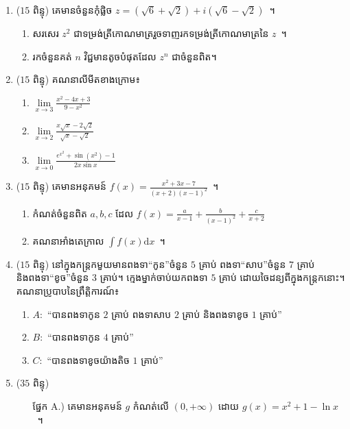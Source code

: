\documentclass[11pt,a4paper]{article}
\def\hhard{\leavevmode\makebox[0pt][r]{\large\ensuremath{\star\star}\hspace{2em}}}
\begin{document}
\begin{enumerate}[I]
\item ($ 15 $ ពិន្ទុ) គេមានចំនួនកុំផ្លិច $ z=(\sqrt{6}+\sqrt{2})+i(\sqrt{6}-\sqrt{2}) $~។
\begin{enumerate}[1]
\item សរសេរ $ z^2 $ ជាទម្រង់ត្រីកោណមាត្ររួចទាញរកទម្រង់ត្រីកោណមាត្រនៃ $ z $~។
\item រកចំនួនគត់ $ n $ វិជ្ជមានតូចបំផុតដែល $ z^n $ ជាចំនួនពិត។
\end{enumerate}
\item ($ 15 $ ពិន្ទុ) គណនាលីមីតខាងក្រោម៖
\begin{multicols}{3}
\begin{enumerate}[a]
\item $ \lim\limits_{x\to 3}\frac{x^2-4x+3}{9-x^2} $
\item $ \lim\limits_{x\to 2}\frac{x\sqrt{x}-2\sqrt{2}}{\sqrt{x}-\sqrt{2}} $
\item $ \lim\limits_{x\to 0}\frac{e^{x^2}+\sin (x^2)-1}{2x\sin x} $
\end{enumerate}
\end{multicols}
\item ($ 15 $ ពិន្ទុ) គេមានអនុគមន៍ $ f(x)=\frac{x^2+3x-7}{(x+2)(x-1)^2} $~។
\begin{enumerate}[1]
\item កំណត់ចំនួនពិត $ a,b,c $ ដែល $ f(x)=\frac{a}{x-1}+\frac{b}{(x-1)^2}+\frac{c}{x+2} $
\item គណនាអាំងតេក្រាល $ \int f(x)\mathrm{d}x $~។
\end{enumerate}
\item ($ 15 $ ពិន្ទុ) នៅក្នុងកន្ត្រកមួយមានពងទា``កូន''ចំនួន $ 5 $ គ្រាប់ ពងទា``សាប''ចំនួន $ 7 $ គ្រាប់ និងពងទា``ខូច''ចំនួន $ 3 $ គ្រាប់។ ក្មេងម្នាក់ចាប់យកពងទា $ 5 $ គ្រាប់ ដោយចៃដន្យពីក្នុងកន្ត្រកនោះ។\\
គណនាប្រូបាបនៃព្រឹត្តិការណ៍៖
\begin{enumerate}[a]
\item $ A: $ ``បានពងទាកូន $ 2 $ គ្រាប់ ពងទាសាប $ 2 $ គ្រាប់ និងពងទាខូច $ 1 $ គ្រាប់''
\item $ B: $ ``បានពងទាកូន $ 4 $ គ្រាប់''
\item $ C: $ ``បានពងទាខូចយ៉ាងតិច $ 1 $ គ្រាប់''
\end{enumerate}
\item\hhard ($ 35 $ ពិន្ទុ) 
\begin{itemize}
\item[ផ្នែក A.)] គេមានអនុគមន៍ $ g $ កំណត់លើ $ (0,+\infty) $ ដោយ $ g(x)=x^2+1-\ln x $~។
\begin{enumerate}[a]

\end{enumerate}
\end{itemize}
\end{enumerate}
\end{document}
